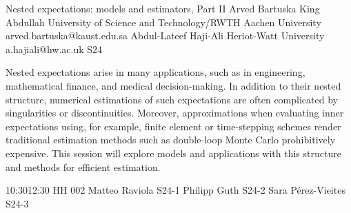 \documentclass[12pt,lettersize,oneside]{book} %
\begin{document}
\clearpage

\begin{session}
 {Nested expectations: models and estimators, Part II}%
 {Arved Bartuska}%
 {King Abdullah University of Science and Technology/RWTH Aachen University}%
 {arved.bartuska@kaust.edu.sa}%
 {Abdul-Lateef Haji-Ali}%
 {Heriot-Watt University}%
 {a.hajiali@hw.ac.uk}%
 {S24}%
{}

 Nested expectations arise in many applications, such as in engineering, mathematical finance, and medical decision-making. In addition to their nested structure, numerical estimations of such expectations are often complicated by singularities or discontinuities. Moreover, approximations when evaluating inner expectations using, for example, finite element or time-stepping schemes render traditional estimation methods such as double-loop Monte Carlo prohibitively expensive. This session will explore models and applications with this structure and methods for efficient estimation.
\end{session}



\sessionPart{}%
{\hfill{}
{10:30}{12:30} %
{HH 002}} %
{Matteo Raviola}
{S24-1}
{Philipp Guth}
{S24-2}
{Sara Pérez-Vieites}
{S24-3}



\clearpage
\end{document}
